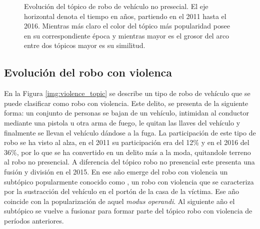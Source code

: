 \begin{figure}
\caption{Evolución del tópico de robo de vehículo no presecial. El eje horizontal denota el tiempo en años, partiendo en el 2011 hasta el 2016. Mientras más claro el color del tópico más popularidad posee en su correspondiente época y mientras mayor es el grosor del arco entre dos tópicos mayor es su similitud.}
\label{img:noviolence_topic}
\end{figure}

\subsection{Evolución del robo con violenca}
\label{sec:violence_topic}

En la Figura \ref{img:violence_topic} se describe un tipo de robo de vehículo que se puede clasificar como robo con violencia. Este delito, se presenta de la siguiente forma: un conjunto de personas se bajan de un vehículo, intimidan al conductor mediante una pistola u otra arma de fuego, le quitan las llaves del vehículo y finalmente se llevan el vehículo dándose a la fuga. La participación de este tipo de robo se ha visto al alza, en el 2011 su participación era del 12\% y en el 2016 del 36\%, por lo que se ha convertido en un delito más a la moda, quitandole terreno al robo no presencial. A diferencia del tópico robo no presencial este presenta una fusión y división en el 2015. En ese año emerge del robo con violencia un subtópico popularmente conocido como , un robo con violencia que se caracteriza por la sustracción del vehículo en el portón de la casa de la víctima. Ese año coincide con la popularización de aquel \textit{modus operandi}. Al siguiente año el subtópico se vuelve a fusionar para formar parte del tópico robo con violencia de períodos anteriores.


